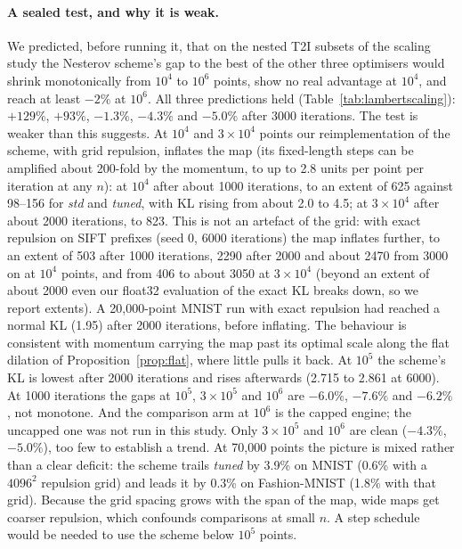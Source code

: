 \documentclass[11pt]{article}
\begin{document}
\paragraph{A sealed test, and why it is weak.} We predicted, before running it, that on the nested T2I subsets of the
scaling study the Nesterov scheme's gap to the best of the other three optimisers would shrink monotonically from
$10^4$ to $10^6$ points, show no real advantage at $10^4$, and reach at least $-2\%$ at $10^6$. All three predictions
held (Table~\ref{tab:lambertscaling}): $+129\%$, $+93\%$, $-1.3\%$, $-4.3\%$ and $-5.0\%$ after 3000 iterations. The
test is weaker than this suggests. At $10^4$ and $3\times10^4$ points our reimplementation of the scheme, with grid
repulsion, inflates the map (its fixed-length steps can be amplified about 200-fold by the momentum, to up to 2.8
units per point per iteration at any $n$): at $10^4$ after about 1000 iterations, to an extent of 625 against 98--156
for \emph{std} and \emph{tuned}, with KL rising from about 2.0 to 4.5; at $3\times10^4$ after about 2000 iterations, to
823. This is not an artefact of the grid: with exact repulsion on SIFT prefixes (seed 0, 6000 iterations) the map
inflates further, to an extent of 503 after 1000 iterations, 2290 after 2000 and about 2470 from 3000 on at $10^4$
points, and from 406
to about 3050 at $3\times10^4$ (beyond an extent of about 2000 even our float32 evaluation of the exact KL breaks down,
so we report extents). A 20{,}000-point MNIST run with exact repulsion had reached a normal KL (1.95) after 2000
iterations, before inflating. The behaviour is consistent with momentum carrying the map past its optimal scale along
the flat dilation of Proposition~\ref{prop:flat}, where little pulls it back. At $10^5$ the scheme's KL is lowest after 2000 iterations and rises afterwards (2.715 to 2.861 at 6000).
At 1000 iterations the gaps at $10^5$, $3\times10^5$ and $10^6$ are $-6.0\%$, $-7.6\%$ and $-6.2\%$, not monotone. And
the comparison arm at $10^6$ is the capped engine; the uncapped one was not run in this study. Only $3\times10^5$ and
$10^6$ are clean ($-4.3\%$, $-5.0\%$), too few to establish a trend. At 70{,}000 points the picture is mixed rather
than a clear deficit: the scheme trails \emph{tuned} by 3.9\% on MNIST (0.6\% with a $4096^2$ repulsion grid) and
leads it by 0.3\% on Fashion-MNIST (1.8\% with that grid). Because the grid spacing grows with the span of the map,
wide maps get coarser repulsion, which confounds comparisons at small $n$. A step schedule would be needed to use the
scheme below $10^5$ points.
\begin{table}[t]\centering\small\resizebox{\linewidth}{!}{}
\caption{Nesterov scheme against the best of \emph{std}, \emph{tuned} and Fourier acceleration (with gains cap) on nested
T2I subsets: median exact KL over three seeds and relative change. Below $10^5$ points the scheme inflates the map
(last row: mean RMS extent over seeds; in brackets, \emph{std} and \emph{tuned}).}\label{tab:lambertscaling}\end{table}
\end{document}
